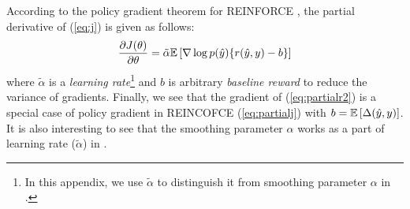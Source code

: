 According to the policy gradient theorem for REINFORCE \cite{williams1992simple,sutton1999policy}, the partial derivative of (\ref{eq:j}) is given as follows:
\begin{align}
\label{eq:partialj}
\frac {\partial J(\theta)}{\partial \theta} = \tilde{\alpha} \mathbb{E} \left[\nabla \log p(\hat{y}) \{r(\hat{y},y) - b \}  \right]
\end{align}
where $\tilde{\alpha}$ is a {\em learning rate}\footnote{In this appendix, we use $\tilde{\alpha}$ to distinguish it from smoothing parameter $\alpha$ in \mrt. } and $b$ is arbitrary {\em baseline reward} to reduce the variance of gradients.
Finally, we see that the gradient of \mrt (\ref{eq:partialr2}) is a special case of policy gradient in REINCOFCE (\ref{eq:partialj}) with $b = \mathbb{E}\left[\Delta(\hat{y},y) \right]$.
It is also interesting to see that the smoothing parameter $\alpha$ works as a part of learning rate ($\tilde{\alpha}$) in \proposed.
